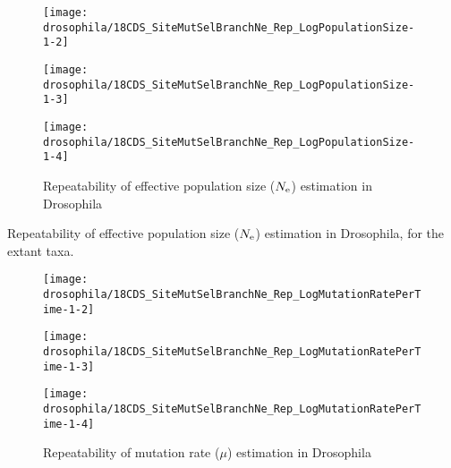 \begin{figure}[H]
    \centering
    \begin{minipage}{0.32\linewidth}
        \texttt{[image: drosophila/18CDS\_SiteMutSelBranchNe\_Rep\_LogPopulationSize-1-2]}
    \end{minipage} \hfill
    \begin{minipage}{0.32\linewidth}
        \texttt{[image: drosophila/18CDS\_SiteMutSelBranchNe\_Rep\_LogPopulationSize-1-3]}
    \end{minipage} \hfill
    \begin{minipage}{0.32\linewidth}
        \texttt{[image: drosophila/18CDS\_SiteMutSelBranchNe\_Rep\_LogPopulationSize-1-4]}
    \end{minipage}
    \caption[Repeatability of {effective population size} estimation in Drosophila]{Repeatability of {effective population size} ($\Ne$) estimation in Drosophila}
\end{figure}

\begin{table}[htbp]
    \renewcommand{\arraystretch}{0.5}
    \scriptsize \centering
    
    \caption[Repeatability of $\Ne$ estimation in Drosophila]{Repeatability of {effective population size} ($\Ne$) estimation in Drosophila, for the extant taxa.}
    \label{tab:Ne-estimated-drosophila}
\end{table}

\begin{figure}[H]
    \centering
    \begin{minipage}{0.32\linewidth}
        \texttt{[image: drosophila/18CDS\_SiteMutSelBranchNe\_Rep\_LogMutationRatePerTime-1-2]}
    \end{minipage} \hfill
    \begin{minipage}{0.32\linewidth}
        \texttt{[image: drosophila/18CDS\_SiteMutSelBranchNe\_Rep\_LogMutationRatePerTime-1-3]}
    \end{minipage} \hfill
    \begin{minipage}{0.32\linewidth}
        \texttt{[image: drosophila/18CDS\_SiteMutSelBranchNe\_Rep\_LogMutationRatePerTime-1-4]}
    \end{minipage}
    \caption[Repeatability of mutation rate estimation in Drosophila]{Repeatability of mutation rate ($\mu$) estimation in Drosophila}
\end{figure}


